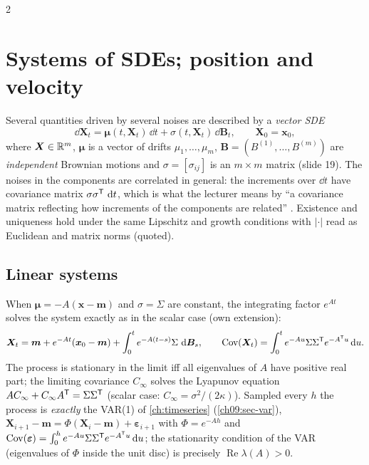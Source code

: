 \begin{paracol}{2}
\section{Systems of SDEs; position and velocity}\label{ch18:sec-sys}

Several quantities driven by several noises are described by a \emph{vector SDE} 
\begin{equation}\label{ch18:eq-vec}
  \dd\bm X_t=\bm\mu(t,\bm X_t)\,\dd t+\sigma(t,\bm X_t)\,\dd\bm B_t,\qquad\bm X_0=\bm x_0,
\end{equation}
where $\bm X\in\mathbb{R}^m$, $\bm\mu$ is a vector of drifts $\mu_1,\dots,\mu_m$, $\bm B=(B^{(1)},\dots,B^{(m)})$ are \emph{independent} Brownian motions and $\sigma=[\sigma_{ij}]$ is an $m\times m$ matrix (slide 19). The noises in the components are correlated in general: the increments over $\dd t$ have covariance matrix $\sigma\sigma^{\mathsf T}\,\,\mathrm{d} t$, which is what the lecturer means by ``a covariance matrix reflecting how increments of the components are related'' . Existence and uniqueness hold under the same Lipschitz and growth conditions with $|\cdot|$ read as Euclidean and matrix norms (quoted).

\subsection{Linear systems}
When $\bm\mu=-A(\bm x-\bm m)$ and $\sigma=\Sigma$ are constant, the integrating factor $e^{At}$ solves the system exactly as in the scalar case (own extension):
\begin{equation}\label{ch18:eq-vecou}
  \bm X_t=\bm m+e^{-At}(\bm x_0-\bm m)+\int_0^te^{-A(t-s)}\Sigma\,\,\mathrm{d}\bm B_s,\qquad
  \operatorname{Cov}(\bm X_t)=\int_0^te^{-Au}\Sigma\Sigma^{\mathsf T} e^{-A^{\mathsf T} u}\,\mathrm{d} u .
\end{equation}
The process is stationary in the limit iff all eigenvalues of $A$ have positive real part; the limiting covariance $C_\infty$ solves the Lyapunov equation $AC_\infty+C_\infty A^{\mathsf T}=\Sigma\Sigma^{\mathsf T}$ (scalar case: $C_\infty=\sigma^2/(2\kappa)$). Sampled every $h$ the process is \emph{exactly} the VAR(1) of \cref{ch:timeseries} (\cref{ch09:sec-var}), $\bm X_{i+1}-\bm m=\Phi(\bm X_i-\bm m)+\bm\varepsilon_{i+1}$ with $\Phi=e^{-Ah}$ and $\operatorname{Cov}(\bm\varepsilon)=\int_0^he^{-Au}\Sigma\Sigma^{\mathsf T} e^{-A^{\mathsf T} u}\,\mathrm{d} u$; the stationarity condition of the VAR (eigenvalues of $\Phi$ inside the unit disc) is precisely $\operatorname{Re}\lambda(A)>0$.


\end{paracol}
